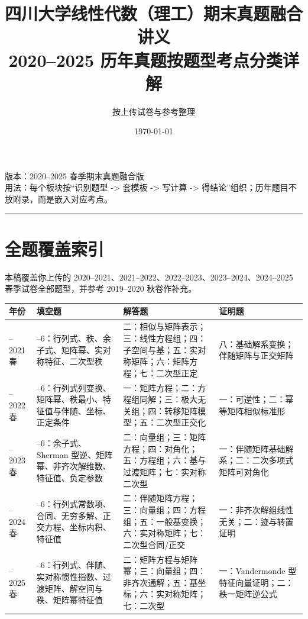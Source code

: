 ﻿\documentclass[11pt,a4paper,UTF8]{ctexart}
\title{\Huge 四川大学线性代数（理工）期末真题融合讲义\\[0.25em]
\Large 2020--2025 历年真题按题型考点分类详解}
\author{按上传试卷与参考整理}
\date{\today}
\begin{document}
\maketitle
\thispagestyle{empty}
\tableofcontents
\newpage

\begin{scorebox}[定位]
版本：2020--2025 春季期末真题融合版\\
用法：每个板块按“识别题型 -> 套模板 -> 写计算 -> 得结论”组织；历年题目不放附录，而是嵌入对应考点。\\
\end{scorebox}

\bigskip\hrule\bigskip

\section{全题覆盖索引}

本稿覆盖你上传的 2020--2021、2021--2022、2022--2023、2023--2024、2024--2025 春季试卷全部题型，并参考 2019--2020 秋卷作补充。

{\scriptsize
\begin{longtable}{>{\raggedright\arraybackslash}p{}>{\raggedright\arraybackslash}p{}>{\raggedright\arraybackslash}p{}>{\raggedright\arraybackslash}p{}}
\toprule
年份 & 填空题 & 解答题 & 证明题 \\
\midrule
2020--2021 春 & 1--6：行列式、秩、余子式、矩阵幂、实对称特征、二次型秩 & 二：相似与矩阵表示；三：线性方程组；四：子空间与基；五：实对称矩阵；六：矩阵方程；七：二次型正定 & 八：基础解系变换；伴随矩阵与正交矩阵 \\
2021--2022 春 & 1--6：行列式列变换、矩阵幂、秩最小、特征值与伴随、坐标、正定条件 & 一：矩阵方程；二：方程组同解；三：极大无关组；四：转移矩阵模型；五：二次型正交化 & 一：可逆性；二：幂等矩阵相似标准形 \\
2022--2023 春 & 1--6：余子式、Sherman 型逆、矩阵幂、非齐次解维数、特征值、负定参数 & 二：向量组；三：矩阵方程；四：对角化；五：方程组；六：基与过渡矩阵；七：实对称二次型 & 一：伴随矩阵基础解系；二：二次多项式矩阵可对角化 \\
2023--2024 春 & 1--6：行列式常数项、合同、无穷多解、正交方程、坐标内积、特征值 & 二：伴随矩阵方程；三：向量组；四：方程组；五：一般基变换；六：实对称矩阵；七：二次型合同/正交 & 一：非齐次解组线性无关；二：迹与转置证明 \\
2024--2025 春 & 1--6：行列式、伴随、实对称惯性指数、过渡矩阵、解空间与秩、矩阵幂特征值 & 二：矩阵方程与矩阵幂；三：向量组；四：非齐次通解；五：基坐标；六：实对称矩阵；七：二次型 & 一：Vandermonde 型特征向量证明；二：秩一矩阵逆公式 \\
\bottomrule
\end{longtable}
}
\end{document}
